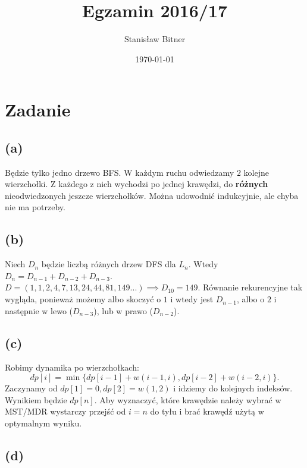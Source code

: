 \documentclass[12pt, a4paper]{article}
\title{Egzamin 2016/17}
\author{Stanisław Bitner}
\date{\today}
\newcounter{zadanie}
\newcommand{\zadanie}{\addtocounter{zadanie}{1}\section*{Zadanie \arabic{zadanie}}}
\begin{document}
\maketitle
\zadanie{}
\subsection*{(a)}
Będzie tylko jedno drzewo BFS. W każdym ruchu odwiedzamy $2$ kolejne
wierzchołki. Z każdego z nich wychodzi po jednej krawędzi, do \textbf{różnych}
nieodwiedzonych jeszcze wierzchołków. Można udowodnić indukcyjnie, ale chyba
nie ma potrzeby.

\subsection*{(b)}
Niech $D_n$ będzie liczbą różnych drzew DFS dla $L_n$. Wtedy
$D_n = D_{n-1} + D_{n-2} + D_{n-3}$.\\ $D = (1,1,2,4,7,13,24,44,81,149...)
\implies D_{10} = 149$. Równanie rekurencyjne tak wygląda, ponieważ możemy albo
skoczyć o $1$ i wtedy jest $D_{n-1}$, albo o $2$ i następnie w lewo
($D_{n-3}$), lub w prawo ($D_{n-2}$).

\subsection*{(c)}
Robimy dynamika po wierzchołkach:
$$\mathit{dp}[i] = \min\{\mathit{dp}[i-1] + w(i-1,i),\mathit{dp}[i-2] + w(i-2,i)\}.$$
Zaczynamy od $\mathit{dp[1]=0, dp[2]=w(1,2)}$ i idziemy do kolejnych indeksów.
Wynikiem będzie $\mathit{dp}[n]$. Aby wyznaczyć, które krawędzie należy wybrać
w MST/MDR wystarczy przejść od $i=n$ do tyłu i brać krawędź użytą w optymalnym
wyniku.

\subsection*{(d)}
\end{document}
